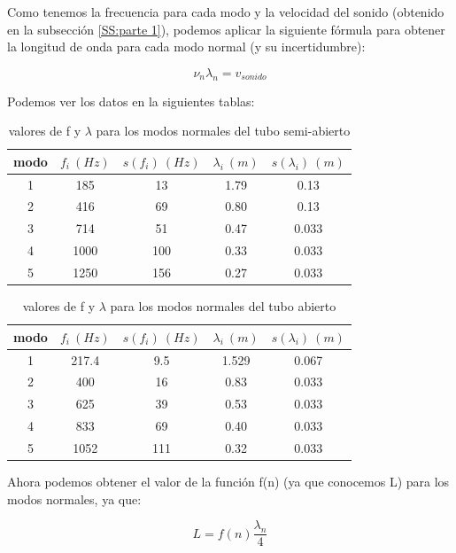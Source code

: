 \documentclass[12pt,a4paper]{article}
\begin{document}
Como tenemos la frecuencia para cada modo y la velocidad del sonido (obtenido en la subsección \ref{SS:parte 1}), podemos aplicar la siguiente fórmula para obtener la longitud de onda para cada modo normal (y su incertidumbre): 

\begin{equation}
\nu_n \lambda_n = v_{sonido}
\end{equation}

Podemos ver los datos en la siguientes tablas:

\begin{table}[h!] \centering
\begin{tabular}{|c|c|c|c|c|}
\hline  modo 	 & $f_i \ (Hz)$ 	 &  $s(f_i) \ (Hz) $ 	 & $\lambda_i \ (m)$ 	 & $s(\lambda_i) \ (m)$  \\ \hline 
1 	 & 185 	 & 13	 & 1.79 & 0.13  \\ 
2 	 & 416	 & 69	 & 0.80 	 & 0.13  \\ 
3 	 & 714	 & 51	 & 0.47 	 & 0.033  \\ 
4 	 & 1000	 & 100 	 & 0.33 	 & 0.033  \\ 
5 	 & 1250	 & 156	 & 0.27 	 & 0.033  \\  \hline 
\end{tabular}
\caption{valores de f y $\lambda$ para los modos normales del tubo semi-abierto}
\end{table}

\begin{table}[h!] \centering
\begin{tabular}{|c|c|c|c|c|} \hline 
modo 	 & $f_i \ (Hz)$ 	 &  $s(f_i) \ (Hz) $ 	 & $\lambda_i \ (m)$ 	 & $s( \lambda_i ) \ (m) $  \\ \hline 
1 	 & 217.4 	 & 9.5 	 & 1.529	 & 0.067  \\ 
 2 	 & 400	 & 16	 & 0.83 	 & 0.033 \\ 
 3 	 & 625	 & 39 	 & 0.53	 & 0.033  \\ 
 4 	 & 833   & 69 	 & 0.40 	 & 0.033  \\ 
 5 	 & 1052 	 & 111 	 & 0.32 	 & 0.033  \\  \hline
\end{tabular}
\caption{valores de f y $\lambda$ para los modos normales del tubo abierto}
\end{table}
Ahora podemos obtener el valor de la función f(n) (ya que conocemos L) para los modos normales, ya que:

\begin{equation}
L = f(n) \dfrac{\lambda_n}{4} \label{Ec:función-n}
\end{equation}
\end{document}
